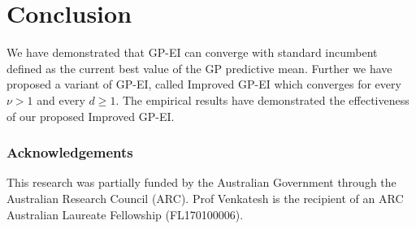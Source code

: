 \documentclass[twoside]{article}
\begin{document}
\section{Conclusion}
We have demonstrated that GP-EI can converge with standard incumbent defined as the current best value of the GP predictive mean. Further we have proposed a variant of GP-EI, called Improved GP-EI which converges for every $\nu > 1$ and every $d \ge 1$. The empirical results have demonstrated the effectiveness of our proposed Improved GP-EI.


\subsubsection*{Acknowledgements}
This research was partially funded by the Australian Government through the Australian Research Council (ARC). Prof Venkatesh is the recipient of an ARC Australian Laureate Fellowship (FL170100006).







\clearpage
\appendix

\thispagestyle{empty}


\onecolumn \makesupplementtitle
\end{document}
